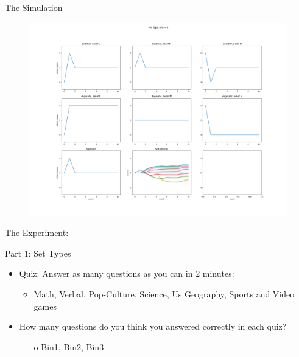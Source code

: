 \documentclass[aspectratio=169]{beamer}
\begin{document}
\begin{frame}{The Simulation}
\label{Figure2}
    \begin{figure}
    \centering
    \includegraphics[scale=0.2]{figures2/all_11.png}
\end{figure}     



\end{frame}


\begin{frame}{The Experiment:}

Part 1: Set Types\\
\bigskip
\begin{itemize}
    \item Quiz: Answer as many questions as you can in 2 minutes:\\
    \begin{itemize}
        \item Math, Verbal, Pop-Culture, Science, Us Geography, Sports and Video games\\
    \end{itemize}
    \bigskip
    \item How many questions do you think you answered correctly in each quiz?\\
    \begin{itemize}
        \item[o] Bin1, Bin2, Bin3
    \end{itemize}
\end{itemize}

\end{frame}
\end{document}
